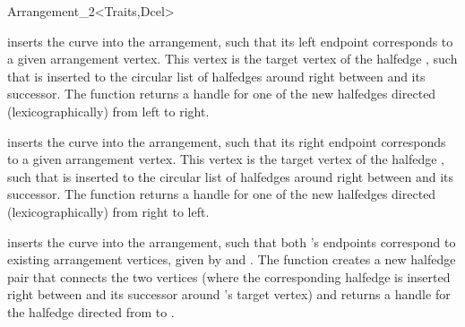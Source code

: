 \begin{ccRefClass}{Arrangement_2<Traits,Dcel>}
\begin{ccAdvanced}
  {inserts the curve  into the arrangement, such that its left
   endpoint corresponds to a given arrangement vertex. This vertex is the
   target vertex of the halfedge , such that  is inserted
   to the circular list of halfedges around  right
   between  and its successor. The function returns a handle for
   one of the new halfedges directed (lexicographically) from left to right.
   }

  {inserts the curve  into the arrangement, such that its right
   endpoint corresponds to a given arrangement vertex. This vertex is the
   target vertex of the halfedge , such that  is inserted
   to the circular list of halfedges around  right
   between  and its successor. The function returns a handle for
   one of the new halfedges directed (lexicographically) from right to left.
   }

  {inserts the curve  into the arrangement, such that both 's
   endpoints correspond to existing arrangement vertices, given by
    and . The function creates a new halfedge
   pair that connects the two vertices (where the corresponding halfedge is
   inserted right between  and its successor around 's
   target vertex) and returns a handle for the halfedge directed from
    to .
   }


\end{ccAdvanced}
\end{ccRefClass}
